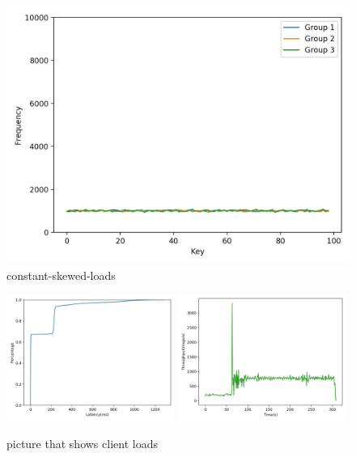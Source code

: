 \begin{figure}[!htb]
  \centering
  \includegraphics[width=\textwidth,height=\textheight,keepaspectratio]{img/clients_loads_constant.png}
  \caption{ constant-skewed-loads }
  \label{fig:constant-skewed-loads}
\end{figure}

\begin{figure}[!htb]
  \centering
  \includegraphics[width=0.49\textwidth,height=\textheight,keepaspectratio]{img/constant50_lat.png}
  \includegraphics[width=0.49\textwidth,height=\textheight,keepaspectratio]{img/constant50_tp.png}
  \caption{ picture that shows client loads }
  \label{fig:constant50-performance}
\end{figure}

